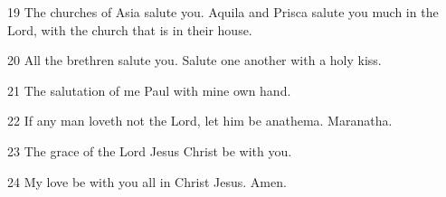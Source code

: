 \par 19 The churches of Asia salute you. Aquila and Prisca salute you much in the Lord, with the church that is in their house.
\par 20 All the brethren salute you. Salute one another with a holy kiss.
\par 21 The salutation of me Paul with mine own hand.
\par 22 If any man loveth not the Lord, let him be anathema. Maranatha.
\par 23 The grace of the Lord Jesus Christ be with you.
\par 24 My love be with you all in Christ Jesus. Amen.

